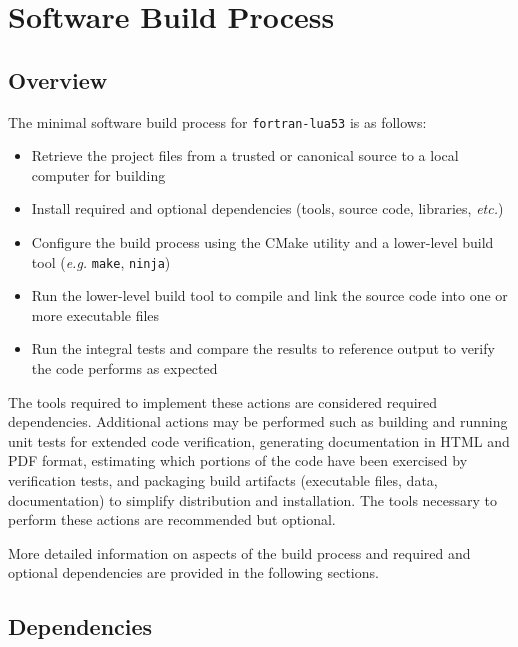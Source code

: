 \chapter{Software Build Process}

\section{Overview}

The minimal software build process for \texttt{fortran-lua53} is as follows:
\begin{itemize}
    \item Retrieve the project files from a trusted or canonical source
    to a local computer for building
    \item Install required and optional dependencies (tools, source
    code, libraries, \textit{etc.})
    \item Configure the build process using the CMake utility and a
    lower-level build tool (\textit{e.g.} \texttt{make},
    \texttt{ninja})
    \item Run the lower-level build tool to compile and link the source
    code into one or more executable files
    \item Run the integral tests and compare the results to reference
    output to verify the code performs as expected
\end{itemize}

The tools required to implement these actions are considered required
dependencies. Additional actions may be performed such as building and
running unit tests for extended code verification, generating
documentation in HTML and PDF format, estimating which portions of the
code have been exercised by verification tests, and packaging build
artifacts (executable files, data, documentation) to simplify
distribution and installation. The tools necessary to perform these
actions are recommended but optional.

More detailed information on aspects of the build process and required
and optional dependencies are provided in the following sections.

\section{Dependencies}



